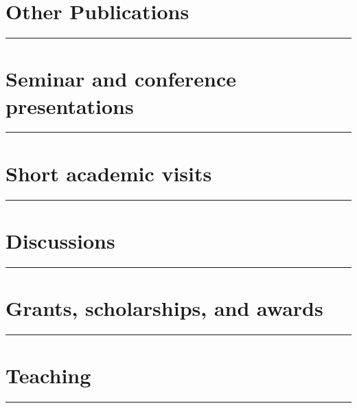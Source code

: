 \documentclass[11pt,plain,titleabove]{simple_cv_hmg}
\newif\ifpubrecord
\begin{document}
\fi 


  \section{Other Publications}
  \vspace{-1cm}
  \rule{\textwidth}{0.5pt}
  
  \vspace{-0.3cm}





\ifpubrecord
\else

  \section{Seminar and conference presentations}
  \vspace{-1cm}
  \rule{\textwidth}{0.5pt}
  
  \vspace{-0.3cm}


  \section{Short academic visits}
  \vspace{-1cm}
  \rule{\textwidth}{0.5pt}
  
  \vspace{-0.3cm}


  \section{Discussions}
  \vspace{-1cm}
  \rule{\textwidth}{0.5pt}
  
  \vspace{-0.3cm}


  \section{Grants, scholarships, and awards}
  \vspace{-1cm}
  \rule{\textwidth}{0.5pt}
  
  \vspace{-0.5cm}



  \section{Teaching }
  \vspace{-1cm}
  \rule{\textwidth}{0.5pt}
    
  \vspace{-0.3cm}
\end{document}
